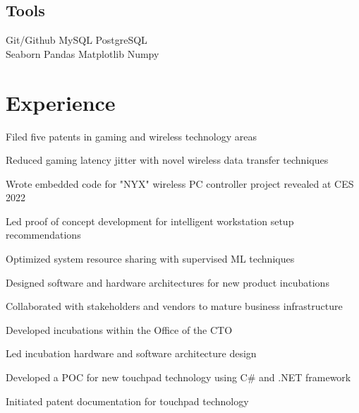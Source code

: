 \documentclass[]{resume-openfont}
\begin{document}
\begin{minipage}[t]{1\textwidth}
\begin{multicols}{3}
    \subsection{Tools}
    Git/Github \textbullet{} MySQL \textbullet{} PostgreSQL \\
    Seaborn \textbullet{} Pandas \textbullet{} Matplotlib \textbullet{} Numpy
    \sectionsep

    \vfill\null
\end{multicols}
\end{minipage} 

\vspace{-5 mm}

\begin{minipage}[t]{1\textwidth}
\section{Experience}
\titlerule
\vspace{2.5 mm}

\vspace{\topsep}
\begin{tightemize}
\item Filed five patents in gaming and wireless technology areas
\item Reduced gaming latency jitter with novel wireless data transfer techniques
\item Wrote embedded code for "NYX" wireless PC controller project revealed at CES 2022
\item Led proof of concept development for intelligent workstation setup recommendations
\end{tightemize}
\sectionsep

\begin{tightemize}
\item Optimized system resource sharing with supervised ML techniques
\item Designed software and hardware architectures for new product incubations
\item Collaborated with stakeholders and vendors to mature business infrastructure
\end{tightemize}
\sectionsep

\begin{tightemize}
\item Developed incubations within the Office of the CTO
\item Led incubation hardware and software architecture design
\item Developed a POC for new touchpad technology using C\# and .NET framework
\item Initiated patent documentation for touchpad technology
\end{tightemize}
\sectionsep


\end{minipage}
\end{document}
